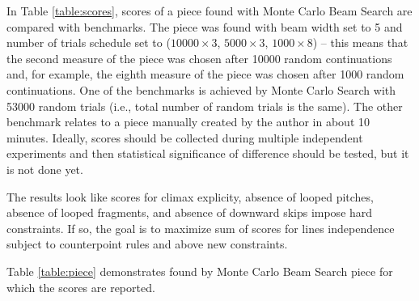\documentclass{article}
\begin{document}
In Table \ref{table:scores}, scores of a piece found with Monte Carlo Beam Search are compared with benchmarks. The piece was found with beam width set to 5 and number of trials schedule set to ($10000 \times 3$, $5000 \times 3$, $1000 \times 8$) -- this means that the second measure of the piece was chosen after 10000 random continuations and, for example, the eighth measure of the piece was chosen after 1000 random continuations. One of the benchmarks is achieved by Monte Carlo Search with 53000 random trials (i.e., total number of random trials is the same). The other benchmark relates to a piece manually created by the author in about 10 minutes. Ideally, scores should be collected during multiple independent experiments and then statistical significance of difference should be tested, but it is not done yet.

The results look like scores for climax explicity, absence of looped pitches, absence of looped fragments, and absence of downward skips impose hard constraints. If so, the goal is to maximize sum of scores for lines independence subject to counterpoint rules and above new constraints.

Table \ref{table:piece} demonstrates found by Monte Carlo Beam Search piece for which the scores are reported.
\end{document}
